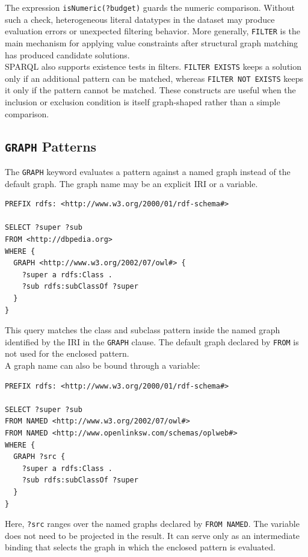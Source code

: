 \documentclass{scrbook}
\begin{document}
	The expression \texttt{isNumeric(?budget)} guards the numeric comparison. Without such a check, heterogeneous literal datatypes in the dataset may produce evaluation errors or unexpected filtering behavior. More generally, \texttt{FILTER} is the main mechanism for applying value constraints after structural graph matching has produced candidate solutions.\\
	
	SPARQL also supports existence tests in filters. \texttt{FILTER EXISTS} keeps a solution only if an additional pattern can be matched, whereas \texttt{FILTER NOT EXISTS} keeps it only if the pattern cannot be matched. These constructs are useful when the inclusion or exclusion condition is itself graph-shaped rather than a simple comparison.
	
	\subsection{\texttt{GRAPH} Patterns}
	
	The \texttt{GRAPH} keyword evaluates a pattern against a named graph instead of the default graph. The graph name may be an explicit IRI or a variable.
	
	\begin{lstlisting}
PREFIX rdfs: <http://www.w3.org/2000/01/rdf-schema#>

SELECT ?super ?sub
FROM <http://dbpedia.org>
WHERE {
  GRAPH <http://www.w3.org/2002/07/owl#> {
    ?super a rdfs:Class .
    ?sub rdfs:subClassOf ?super
  }
}
	\end{lstlisting}
	
	This query matches the class and subclass pattern inside the named graph identified by the IRI in the \texttt{GRAPH} clause. The default graph declared by \texttt{FROM} is not used for the enclosed pattern.\\
	
	A graph name can also be bound through a variable:
	
	\begin{lstlisting}
PREFIX rdfs: <http://www.w3.org/2000/01/rdf-schema#>

SELECT ?super ?sub
FROM NAMED <http://www.w3.org/2002/07/owl#>
FROM NAMED <http://www.openlinksw.com/schemas/oplweb#>
WHERE {
  GRAPH ?src {
    ?super a rdfs:Class .
    ?sub rdfs:subClassOf ?super
  }
}
	\end{lstlisting}
	
	Here, \texttt{?src} ranges over the named graphs declared by \texttt{FROM NAMED}. The variable does not need to be projected in the result. It can serve only as an intermediate binding that selects the graph in which the enclosed pattern is evaluated.
	
\end{document}
